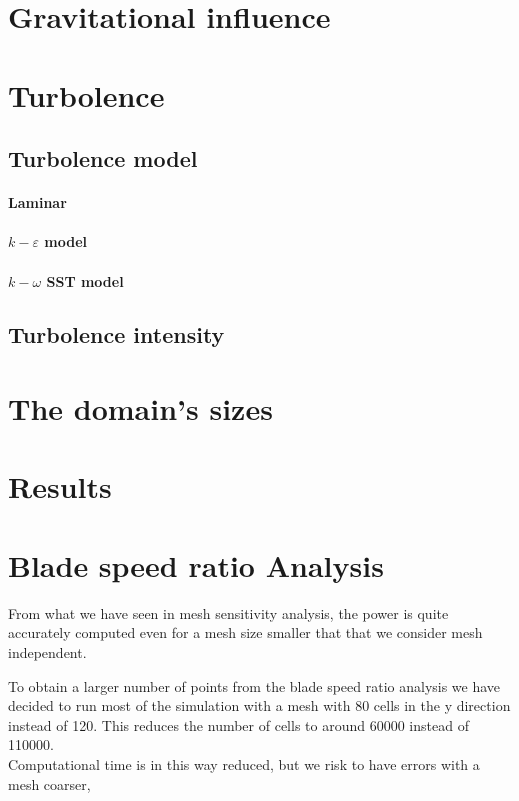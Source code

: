 \documentclass[a4paper,12pt]{article}
\begin{document}
\section{Gravitational influence}

\section{Turbolence}

\subsection{Turbolence model}

\paragraph{Laminar}

\paragraph{$k-\varepsilon$ model}

\paragraph{$k-\omega $ SST model}

\subsection{Turbolence intensity}

\section{The domain's sizes}

\section{Results}

\section{Blade speed ratio Analysis}

From what we have seen in mesh sensitivity analysis, the power is quite accurately computed even for a mesh size smaller that that we consider mesh independent.

To obtain a larger number of points from the blade speed ratio analysis we have decided to run most of the simulation with a mesh with 80 cells in the y direction instead of 120. This reduces the number of cells to around 60000 instead of 110000. 
\\Computational time is in this way reduced, but we risk to have errors with a mesh coarser,
\end{document}
